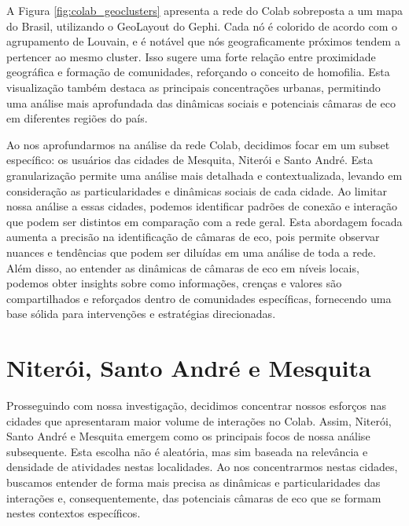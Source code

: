 A Figura \ref{fig:colab_geoclusters} apresenta a rede do Colab sobreposta a um mapa do Brasil, utilizando o GeoLayout do Gephi. Cada nó é colorido de acordo com o agrupamento de Louvain, e é notável que nós geograficamente próximos tendem a pertencer ao mesmo cluster. Isso sugere uma forte relação entre proximidade geográfica e formação de comunidades, reforçando o conceito de homofilia. Esta visualização também destaca as principais concentrações urbanas, permitindo uma análise mais aprofundada das dinâmicas sociais e potenciais câmaras de eco em diferentes regiões do país.

Ao nos aprofundarmos na análise da rede Colab, decidimos focar em um subset específico: os usuários das cidades de Mesquita, Niterói e Santo André. Esta granularização permite uma análise mais detalhada e contextualizada, levando em consideração as particularidades e dinâmicas sociais de cada cidade. Ao limitar nossa análise a essas cidades, podemos identificar padrões de conexão e interação que podem ser distintos em comparação com a rede geral. Esta abordagem focada aumenta a precisão na identificação de câmaras de eco, pois permite observar nuances e tendências que podem ser diluídas em uma análise de toda a rede. Além disso, ao entender as dinâmicas de câmaras de eco em níveis locais, podemos obter insights sobre como informações, crenças e valores são compartilhados e reforçados dentro de comunidades específicas, fornecendo uma base sólida para intervenções e estratégias direcionadas.

\section{Niterói, Santo André e Mesquita}

Prosseguindo com nossa investigação, decidimos concentrar nossos esforços nas cidades que apresentaram maior volume de interações no Colab. Assim, Niterói, Santo André e Mesquita emergem como os principais focos de nossa análise subsequente. Esta escolha não é aleatória, mas sim baseada na relevância e densidade de atividades nestas localidades. Ao nos concentrarmos nestas cidades, buscamos entender de forma mais precisa as dinâmicas e particularidades das interações e, consequentemente, das potenciais câmaras de eco que se formam nestes contextos específicos.

